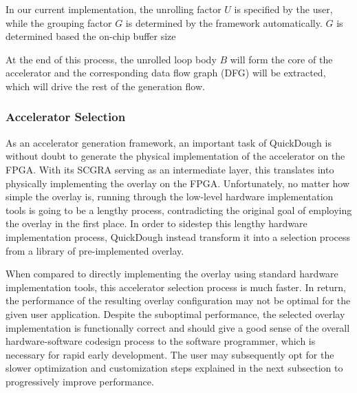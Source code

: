 In our current implementation, the unrolling factor $U$ is specified by the user, while the grouping factor $G$ is determined by the framework automatically.
$G$ is determined based the on-chip buffer size

At the end of this process, the unrolled loop body $B$ will form the core of the accelerator and the corresponding data flow graph (DFG) will be extracted, which will drive the rest of the generation flow.



\subsubsection{Accelerator Selection}
As an accelerator generation framework, an important task of QuickDough is without doubt to generate the physical implementation of the accelerator on the FPGA.
With its SCGRA serving as an intermediate layer, this translates into physically implementing the overlay on the FPGA.
Unfortunately, no matter how simple the overlay is, running through the low-level hardware implementation tools is going to be a lengthy process, contradicting the original goal of employing the overlay in the first place.
In order to sidestep this lengthy hardware implementation process, QuickDough instead transform it into a selection process from a library of pre-implemented overlay.

When compared to directly implementing the overlay using standard hardware implementation tools, this accelerator selection process is much faster.
In return, the performance of the resulting overlay configuration may not be optimal for the given user application.
Despite the suboptimal performance, the selected overlay implementation is functionally correct and should give a good sense of the overall hardware-software codesign process to the software programmer, which is necessary for rapid early development.
The user may subsequently opt for the slower optimization and customization steps explained in the next subsection to progressively improve performance.

